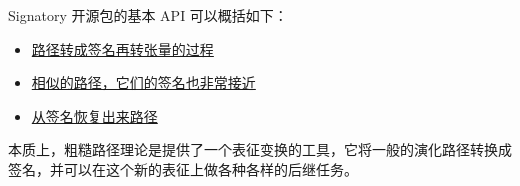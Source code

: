 \documentclass[11pt]{article}
\begin{document}
Signatory 开源包的基本 API 可以概括如下：
\begin{itemize}
\item \href{https://signatory.readthedocs.io/en/latest/pages/examples/neuralnetworks.html}{路径转成签名再转张量的过程}
\item \href{https://signatory.readthedocs.io/en/latest/pages/examples/translation.html}{相似的路径，它们的签名也非常接近}
\item \href{https://signatory.readthedocs.io/en/latest/pages/examples/inversion.html}{从签名恢复出来路径}
\end{itemize}

本质上，粗糙路径理论是提供了一个表征变换的工具，它将一般的演化路径转换成签名，并可以在这个新的表征上做各种各样的后继任务。

\newpage
{}
{}


\end{document}
